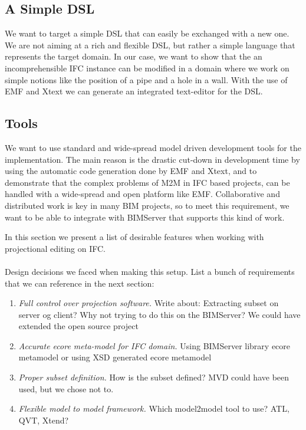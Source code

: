 \subsection{A Simple DSL}
We want to target a simple DSL that can easily be exchanged with a new one. We are not aiming at a rich and flexible DSL, but rather a simple
language that represents the target domain. In our case, we want to show that the an incomprehensible IFC instance can be modified in a domain where we work on simple notions like the position of a pipe and a hole in a wall. With the use of EMF and Xtext we can generate an integrated text-editor for the DSL.

\subsection{Tools}
We want to use standard and wide-spread model driven development tools for the implementation. The main reason is the drastic cut-down in development time by using the automatic code generation done by EMF and Xtext, and to demonstrate that the complex problems of M2M in IFC based projects, can be handled with a wide-spread and open platform like EMF. Collaborative and distributed work is key in many BIM projects, so to meet this requirement, we want to be able to integrate with BIMServer that supports this kind of work.

In this section we present a list of desirable features when working with projectional editing on IFC.
\paragraph{}
Design decisions we faced when making this setup. List a bunch of requirements that we can reference in the next section:
\begin{enumerate}[itemsep=0pt,parsep=2pt,topsep=10pt]
	\item {\it Full control over projection software.} Write about: Extracting subset on server og client? Why not trying to do this on the BIMServer? We could have extended the open source project
	\item {\it Accurate ecore meta-model for IFC domain.} Using BIMServer library ecore metamodel or using XSD generated ecore metamodel
	\item {\it Proper subset definition.} How is the subset defined? MVD could have been used, but we chose not to.
	\item {\it Flexible model to model framework.} Which model2model tool to use? ATL, QVT, Xtend?
\end{enumerate}
